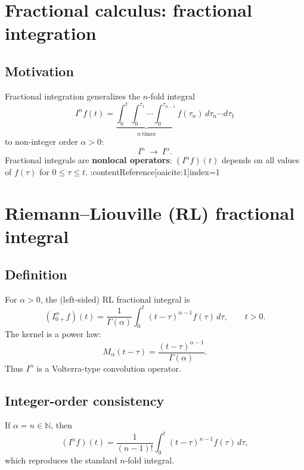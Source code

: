 
\section{Fractional calculus: fractional integration}

\subsection{Motivation}
Fractional integration generalizes the $n$-fold integral
\[
I^n f(t)=\underbrace{\int_0^t\int_0^{\tau_1}\cdots\int_0^{\tau_{n-1}}}_{n\ \text{times}}
f(\tau_n)\,d\tau_n\cdots d\tau_1
\]
to non-integer order $\alpha>0$:
\[
I^n \ \longrightarrow\ I^\alpha.
\]
Fractional integrals are \textbf{nonlocal operators}: $(I^\alpha f)(t)$ depends on all
values of $f(\tau)$ for $0\le \tau\le t$. :contentReference[oaicite:1]{index=1}


\section{Riemann--Liouville (RL) fractional integral}

\subsection{Definition}
For $\alpha>0$, the (left-sided) RL fractional integral is
\begin{equation}
\boxed{
(I_{0+}^\alpha f)(t)
=
\frac{1}{\Gamma(\alpha)}
\int_0^t (t-\tau)^{\alpha-1}f(\tau)\,d\tau,
\qquad t>0.
}
\end{equation}
The kernel is a power law:
\[
M_\alpha(t-\tau)=\frac{(t-\tau)^{\alpha-1}}{\Gamma(\alpha)}.
\]
Thus $I^\alpha$ is a Volterra-type convolution operator.

\subsection{Integer-order consistency}
If $\alpha=n\in\mathbb{N}$, then
\begin{equation}
(I^n f)(t)
=
\frac{1}{(n-1)!}\int_0^t (t-\tau)^{n-1}f(\tau)\,d\tau,
\end{equation}
which reproduces the standard $n$-fold integral.

